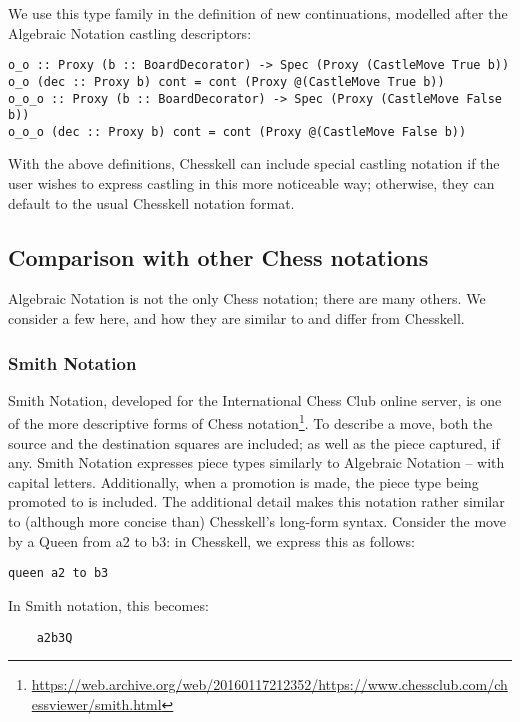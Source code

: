 We use this type family in the definition of new continuations, modelled after the Algebraic Notation castling descriptors:

\begin{lstlisting}
o_o :: Proxy (b :: BoardDecorator) -> Spec (Proxy (CastleMove True b))
o_o (dec :: Proxy b) cont = cont (Proxy @(CastleMove True b))
o_o_o :: Proxy (b :: BoardDecorator) -> Spec (Proxy (CastleMove False b))
o_o_o (dec :: Proxy b) cont = cont (Proxy @(CastleMove False b))
\end{lstlisting}

With the above definitions, Chesskell can include special castling notation if the user wishes to express castling in this more noticeable way; otherwise, they can default to the usual Chesskell notation format.

\subsection{Comparison with other Chess notations}

Algebraic Notation is not the only Chess notation; there are many others. We consider a few here, and how they are similar to and differ from Chesskell.

\subsubsection{Smith Notation} \label{smithsection}

Smith Notation, developed for the International Chess Club online server, is one of the more descriptive forms of Chess notation\footnote{\url{https://web.archive.org/web/20160117212352/https://www.chessclub.com/chessviewer/smith.html}}. To describe a move, both the source and the destination squares are included; as well as the piece captured, if any. Smith Notation expresses piece types similarly to Algebraic Notation -- with capital letters. Additionally, when a promotion is made, the piece type being promoted to is included. The additional detail makes this notation rather similar to (although more concise than) Chesskell's long-form syntax. Consider the move by a Queen from a2 to b3: in Chesskell, we express this as follows:

\begin{lstlisting}
queen a2 to b3
\end{lstlisting}

In Smith notation, this becomes:

\begin{verbatim}
    a2b3Q
\end{verbatim}

